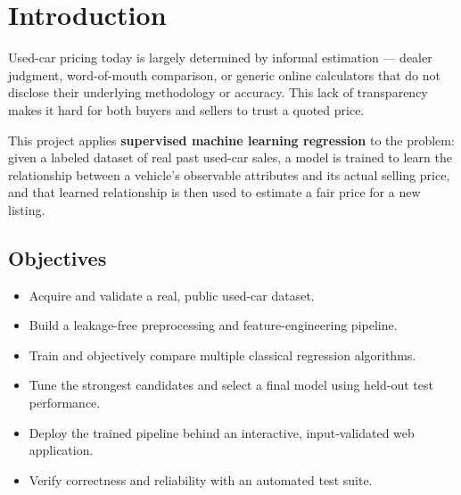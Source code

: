 \documentclass[12pt,a4paper]{report}
\begin{document}
\tableofcontents

\section*{\listfigurename}

\section*{\listtablename}
\makeatother
\endgroup

\clearpage
{}
\setcounter{page}{1}

\chapter{Introduction}

Used-car pricing today is largely determined by informal estimation ---
dealer judgment, word-of-mouth comparison, or generic online calculators
that do not disclose their underlying methodology or accuracy. This lack
of transparency makes it hard for both buyers and sellers to trust a
quoted price.

This project applies \textbf{supervised machine learning regression} to
the problem: given a labeled dataset of real past used-car sales, a model
is trained to learn the relationship between a vehicle's observable
attributes and its actual selling price, and that learned relationship is
then used to estimate a fair price for a new listing.

\section*{Objectives}
\begin{itemize}[nosep]
    \item Acquire and validate a real, public used-car dataset.
    \item Build a leakage-free preprocessing and feature-engineering pipeline.
    \item Train and objectively compare multiple classical regression algorithms.
    \item Tune the strongest candidates and select a final model using held-out test performance.
    \item Deploy the trained pipeline behind an interactive, input-validated web application.
    \item Verify correctness and reliability with an automated test suite.
\end{itemize}
\end{document}
